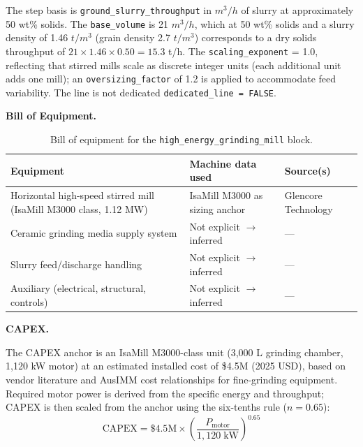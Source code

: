 The step basis is \texttt{ground\_slurry\_throughput} in $\si{m^3/h}$ of slurry at approximately 50 wt\% solids. The \texttt{base\_volume} is 21 $\si{m^3/h}$, which at 50 wt\% solids and a slurry density of 1.46 $\si{t/m^3}$ (grain density 2.7 $\si{t/m^3}$) corresponds to a dry solids throughput of $21 \times 1.46 \times 0.50 = 15.3$ t/h. The \texttt{scaling\_exponent} = 1.0, reflecting that stirred mills scale as discrete integer units (each additional unit adds one mill); an \texttt{oversizing\_factor} of 1.2 is applied to accommodate feed variability. The line is not dedicated \texttt{dedicated\_line = FALSE}.


\medskip
\noindent\textbf{Bill of Equipment.}\quad

\begin{table}[h!]
\caption{Bill of equipment for the \texttt{high\_energy\_grinding\_mill} block.}
\centering
\begin{tabular}{>{\raggedright\arraybackslash}p{5.2cm}
				>{\raggedright\arraybackslash}p{4cm}
				>{\raggedright\arraybackslash}p{4.5cm}}
\toprule
\textbf{Equipment} & \textbf{Machine data used} & \textbf{Source(s)} \\
\midrule
Horizontal high-speed stirred mill (IsaMill M3000 class, 1.12 MW) & IsaMill M3000 as sizing anchor & Glencore Technology \\
Ceramic grinding media supply system & Not explicit $\rightarrow$ inferred & --- \\
Slurry feed/discharge handling & Not explicit $\rightarrow$ inferred & --- \\
Auxiliary (electrical, structural, controls) & Not explicit $\rightarrow$ inferred & --- \\
\bottomrule
\end{tabular}
\end{table}


\medskip
\noindent\textbf{CAPEX.}\quad

The CAPEX anchor is an IsaMill M3000-class unit (3,000 L grinding chamber, 1,120 kW motor) at an estimated installed cost of \$4.5M (2025 USD), based on vendor literature and AusIMM cost relationships for fine-grinding equipment. Required motor power is derived from the specific energy and throughput; CAPEX is then scaled from the anchor using the six-tenths rule ($n = 0.65$):
\[
	\text{CAPEX} = \$4.5\text{M} \times \left(\frac{P_{\text{motor}}}{1{,}120\;\text{kW}}\right)^{0.65}
\]

